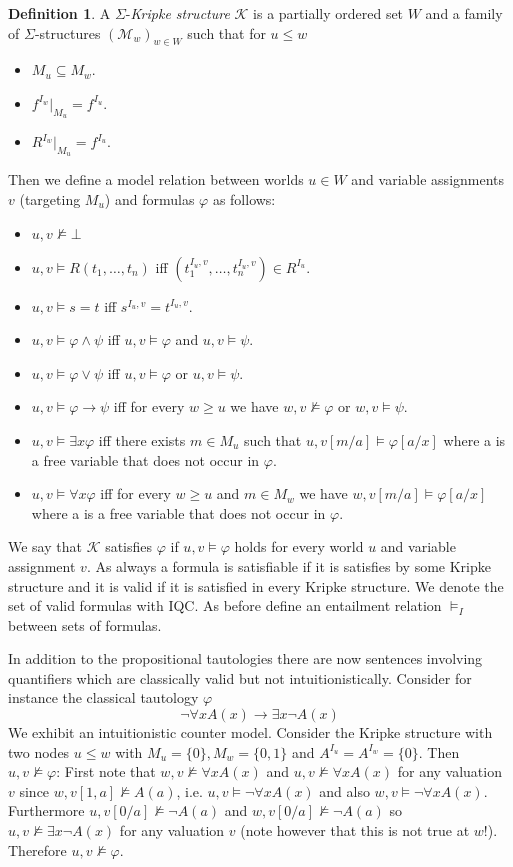 \documentclass[a4paper,12pt]{report}
\theoremstyle{definition}
\theoremstyle{definition}
\theoremstyle{definition}
\theoremstyle{definition}
\theoremstyle{definition}
\newtheorem{definition}[theorem]{Definition}
\theoremstyle{definition}
\theoremstyle{definition}
\begin{document}
	\begin{definition}
		A $\Sigma$-\textit{Kripke structure} $\mathcal{K}$ is a partially ordered set $W$ and a family of $\Sigma$-structures $(\mathcal{M}_w)_{w\in W}$ such that for $u\leq w$
		\begin{itemize}
			\item $M_u\subseteq M_w$.
			\item $f^{I_w}|_{M_u} = f^{I_u}$.
			\item $R^{I_w}|_{M_u} = f^{I_u}$.
		\end{itemize}
		Then we define a model relation between worlds $u\in W$ and variable assignments $v$ (targeting $M_u$) and formulas $\varphi$ as follows:
		\begin{itemize}
			\item $u, v\not\models\bot$
			\item $u, v\models R(t_1,\dots,t_n)$ iff $(t_1^{I_u, v},\dots,t_n^{I_u, v})\in R^{I_u}$.
			\item $u, v\models s = t$ iff $s^{I_u, v} = t^{I_u, v}$.
			\item $u, v\models \varphi\wedge \psi$ iff $u, v\models\varphi$ and $u, v\models\psi$.
			\item $u, v\models \varphi\vee\psi$ iff $u, v\models\varphi$ or $u, v\models\psi$.
			\item $u, v\models \varphi\to\psi$ iff for every $w\geq u$ we have $w, v\not\models\varphi$ or $w, v\models\psi$.
			\item $u, v\models\exists x\varphi$ iff there exists $m\in M_u$ such that $u, v[m/a]\models\varphi[a/x]$ where a is a free variable that does not occur in $\varphi$.
			\item $u, v\models\forall x\varphi$ iff for every $w\geq u$ and $m\in M_w$ we have $w, v[m/a]\models\varphi[a/x]$ where a is a free variable that does not occur in $\varphi$.
		\end{itemize}
		We say that $\mathcal{K}$ satisfies $\varphi$ if $u, v\models\varphi$ holds for every world $u$ and variable assignment $v$. As always a formula is satisfiable if it is satisfies by some Kripke structure and it is valid if it is satisfied in every Kripke structure. We denote the set of valid formulas with IQC.  As before define an entailment relation $\models_I$ between sets of formulas.
	\end{definition}
	In addition to the propositional tautologies there are now sentences involving quantifiers which are classically valid but not intuitionistically.
	Consider for instance the classical tautology $\varphi$ $$\neg\forall x A(x)\to \exists x \neg A(x)$$We exhibit an intuitionistic counter model. Consider the Kripke structure with two nodes $u\leq w$ with $M_u = \{0\}, M_w = \{0, 1\}$ and $A^{I_u} = A^{I_w} = \{0\}$. Then $u, v\not\models \varphi$: First note that $w, v\not\models\forall xA(x)$ and $u, v\not\models\forall xA(x)$ for any valuation $v$ since $w, v[1, a]\not\models A(a)$, i.e. $u, v\models\neg\forall xA(x)$ and also $w, v\models\neg\forall xA(x)$. Furthermore $u, v[0/a]\not\models \neg A(a)$ and $w, v[0/a]\not\models \neg A(a)$ so $u, v\not\models \exists x\neg A(x)$ for any valuation $v$ (note however that this is not true at $w$!). Therefore $u, v\not\models\varphi$.
	
\end{document}

